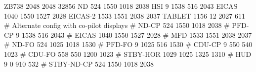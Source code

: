 ZB738 2048 2048 32856
ND        524 1550 1018 2038
HSI         9 1538  516 2043
EICAS    1040 1550 1527 2028
EICAS-2  1533 1551 2038 2037
TABLET   1156   12 2027  611
# Alternate config with co-pilot displays
# ND-CP           524 1550 1018 2038
# PFD-CP            9 1538  516 2043
# EICAS          1040 1550 1527 2028
# MFD            1533 1551 2038 2037
# ND-FO           524 1025 1018 1530
# PFD-FO            9 1025  516 1530
# CDU-CP            9  550  540 1023
# CDU-FO          558  550 1200 1023
# STBY-HOR       1029 1025 1325 1310
# HUD               9    0  910  532
# STBY-ND-CP      524 1550 1018 2038
